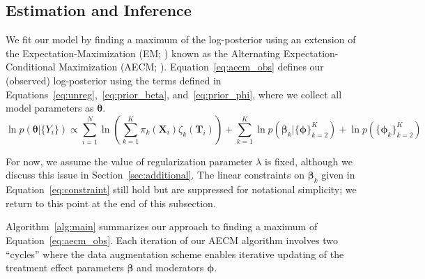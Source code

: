 \documentclass[11pt]{article}
\newcommand\bT{\bm{T}}
\newcommand\bX{\bm{X}}
\begin{document}
\subsection{Estimation and Inference}

We fit our model by finding a maximum of the log-posterior using an
extension of the Expectation-Maximization (EM;
\citealt{demp:lair:rubi:77}) known as the Alternating
Expectation-Conditional Maximization (AECM;
\citealt{meng:vand:97}). Equation~\eqref{eq:aecm_obs} defines our
(observed) log-posterior using the terms defined in
Equations~\eqref{eq:unreg},~\eqref{eq:prior_beta},
and~\eqref{eq:prior_phi}, where we collect all model parameters as
$\bm{\theta}$.
\begin{equation}
\label{eq:aecm_obs}
\ln p(\bm{\theta} | \{Y_i\}) \propto \sum_{i=1}^N \ln\left(\sum_{k=1}^K \pi_{k}(\bX_i) \zeta_k(\bT_i)\right) + \sum_{k=1}^K \ln p(\bm{\beta}_k | \{\bm{\phi}\}_{k=2}^K) + \ln p(\{\bm{\phi}_k\}_{k=2}^K)
\end{equation}

For now, we assume the value of regularization parameter $\lambda$ is
fixed, although we discuss this issue in
Section~\ref{sec:additional}. The linear constraints on $\bm{\beta}_k$
given in Equation~\eqref{eq:constraint} still hold but are suppressed
for notational simplicity; we return to this point at the end of this
subsection.

Algorithm~\ref{alg:main} summarizes our approach to finding a maximum
of Equation~\eqref{eq:aecm_obs}.  Each iteration of our AECM algorithm
involves two ``cycles'' where the data augmentation scheme enables
iterative updating of the treatment effect parameters $\bm{\beta}$ and
moderators $\bm{\phi}$.
\end{document}
